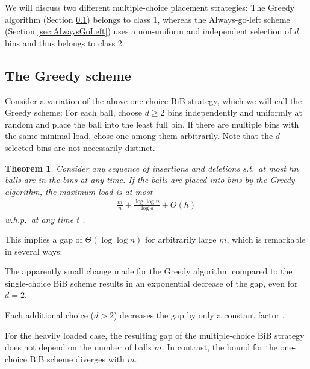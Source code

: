 \documentclass[a4paper,12pt]{article}
\newcommand\todo[1]{\textcolor{red}{(TODO: #1)}}
\newtheorem{theorem}{Theorem}
\begin{document}
We will discuss two different multiple-choice placement strategies: The Greedy algorithm (Section \ref{sec:greedy}) belongs to class 1, whereas the Always-go-left scheme (Section \ref{sec:AlwaysGoLeft}) uses a non-uniform and independent selection of $d$ bins and thus belongs to class 2.

\subsection{The Greedy scheme}
\label{sec:greedy}

Consider a variation of the above one-choice BiB strategy, which we will call the Greedy scheme: For each ball, choose $d \geq 2$ bins independently and uniformly at random and place the ball into the least full bin. If there are multiple bins with the same minimal load, chose one among them arbitrarily. Note that the $d$ selected bins are not necessarily distinct. 

\begin{theorem}
\label{theorem:greedy}
Consider any sequence of insertions and deletions s.t.~at most $hn$ balls are in the bins at any time. If the balls are placed into bins by the Greedy algorithm, the maximum load is at most 
\begin{align*}
\frac{m}{n} + \frac{\log \log n}{\log d}+ O(h)
\end{align*}
w.h.p.~at any time $t$ \cite{ABKU99} \cite{BCSV06}.
\end{theorem}

This implies a gap of $\Theta\left(\log \log n \right)$ for arbitrarily large $m$, which is remarkable in several ways:
\begin{compactitem}
\item The apparently small change made for the Greedy algorithm compared to the single-choice BiB scheme results in an exponential decrease of the gap, even for $d=2$. 
\item Each additional choice ($d > 2$) decreases the gap by only a constant factor \cite{MRS01}. 
\item For the heavily loaded case, the resulting gap of the multiple-choice BiB strategy does not depend on the number of balls $m$. In contrast, the bound for the one-choice BiB scheme diverges with $m$.
\begin{comment}
\todo{the following is only true for class 1 algorithms}
\item The given bounds are tight, meaning that no other strategy that places each ball into one of $d$ randomly selected bins achieves a gap that is asymptotically lower.
\end{comment}
\end{compactitem}
\end{document}
